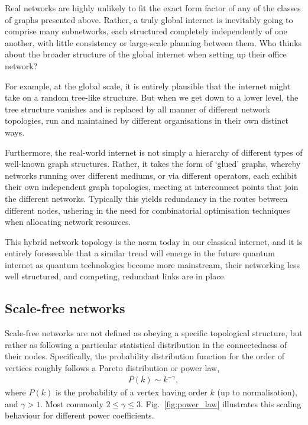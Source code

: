 Real networks are highly unlikely to fit the exact form factor of any of the classes of graphs presented above. Rather, a truly global internet is inevitably going to comprise many subnetworks, each structured completely independently of one another, with little consistency or large-scale planning between them. Who thinks about the broader structure of the global internet when setting up their office network?

For example, at the global scale, it is entirely plausible that the internet might take on a random tree-like structure. But when we get down to a lower level, the tree structure vanishes and is replaced by all manner of different network topologies, run and maintained by different organisations in their own distinct ways.

Furthermore, the real-world internet is not simply a hierarchy of different types of well-known graph structures. Rather, it takes the form of `glued' graphs, whereby networks running over different mediums, or via different operators, each exhibit their own independent graph topologies, meeting at interconnect points that join the different networks. Typically this yields redundancy in the routes between different nodes, ushering in the need for combinatorial optimisation techniques when allocating network resources.

This hybrid network topology is the norm today in our classical internet, and it is entirely foreseeable that a similar trend will emerge in the future quantum internet as quantum technologies become more mainstream, their networking less well structured, and competing, redundant links are in place.

%
%

\subsection{Scale-free networks}\label{sec:scale_free_networks}

Scale-free networks are not defined as obeying a specific topological structure, but rather as following a particular statistical distribution in the connectedness of their nodes. Specifically, the probability distribution function for the order of vertices roughly follows a Pareto distribution or power law,
\begin{align}\label{eq:pareto_dist}
	P(k) \sim k^{-\gamma},
\end{align}
where $P(k)$ is the probability of a vertex having order $k$ (up to normalisation), and \mbox{$\gamma>1$}. Most commonly \mbox{$2\leq\gamma\leq 3$}. Fig.~\ref{fig:power_law} illustrates this scaling behaviour for different power coefficients.

